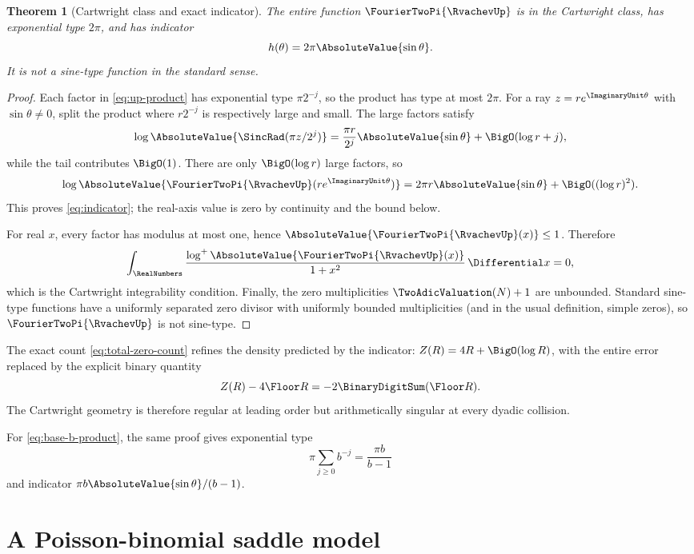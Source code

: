 \documentclass[11pt]{article}
\numberwithin{equation}{section}
\newtheorem{theorem}{Theorem}[section]
\theoremstyle{definition}
\theoremstyle{remark}
\begin{document}
\begin{theorem}[Cartwright class and exact indicator]\label{thm:cartwright}
The entire function $\FourierTwoPi{\RvachevUp}$ is in the Cartwright class, has exponential type $2\pi$, and has indicator
\begin{equation}\label{eq:indicator}
 h(\theta)=2\pi\AbsoluteValue{\sin\theta}.
\end{equation}
It is not a sine-type function in the standard sense.
\end{theorem}
\begin{proof}
Each factor in \eqref{eq:up-product} has exponential type $\pi2^{-j}$, so the product has type at most $2\pi$.  For a ray $z=re^{\ImaginaryUnit\theta}$ with $\sin\theta\ne0$, split the product where $r2^{-j}$ is respectively large and small.  The large factors satisfy
\[
 \log\AbsoluteValue{\SincRad(\pi z/2^j)}
 =\frac{\pi r}{2^j}\AbsoluteValue{\sin\theta}+\BigO(\log r+j),
\]
while the tail contributes $\BigO(1)$.  There are only $\BigO(\log r)$ large factors, so
\[
 \log\AbsoluteValue{\FourierTwoPi{\RvachevUp}(re^{\ImaginaryUnit\theta})}
 =2\pi r\AbsoluteValue{\sin\theta}+\BigO((\log r)^2).
\]
This proves \eqref{eq:indicator}; the real-axis value is zero by continuity and the bound below.

For real $x$, every factor has modulus at most one, hence
$\AbsoluteValue{\FourierTwoPi{\RvachevUp}(x)}\le1$.  Therefore
\[
 \int_{\RealNumbers}\frac{\log^+\AbsoluteValue{\FourierTwoPi{\RvachevUp}(x)}}{1+x^2}\,\Differential x=0,
\]
which is the Cartwright integrability condition.  Finally, the zero multiplicities $\TwoAdicValuation(N)+1$ are unbounded.  Standard sine-type functions have a uniformly separated zero divisor with uniformly bounded multiplicities (and in the usual definition, simple zeros), so $\FourierTwoPi{\RvachevUp}$ is not sine-type.
\end{proof}

The exact count \eqref{eq:total-zero-count} refines the density predicted by the indicator: $Z(R)=4R+\BigO(\log R)$, with the entire error replaced by the explicit binary quantity
\[
 Z(R)-4\Floor R=-2\BinaryDigitSum(\Floor R).
\]
The Cartwright geometry is therefore regular at leading order but arithmetically singular at every dyadic collision.

For \eqref{eq:base-b-product}, the same proof gives exponential type
\[
 \pi\sum_{j\ge0}b^{-j}=\frac{\pi b}{b-1}
\]
and indicator $\pi b\AbsoluteValue{\sin\theta}/(b-1)$.

\section{A Poisson-binomial saddle model}\label{sec:poisson}
\end{document}
